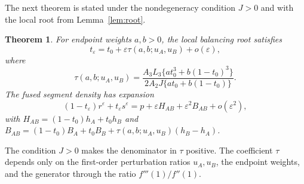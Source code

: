 \documentclass[11pt]{article}
\theoremstyle{plain}
\newtheorem{theorem}{Theorem}
\theoremstyle{definition}
\theoremstyle{definition}
\newcommand{\eps}{\varepsilon}
\begin{document}
The next theorem is stated under the nondegeneracy condition $J>0$ and with the local root from Lemma~\ref{lem:root}.

\begin{theorem}\label{thm:binary}
For endpoint weights $a,b>0$, the local balancing root satisfies
\[
t_\eps=t_0+\eps\tau(a,b;u_A,u_B)+o(\eps),
\]
where
\[
\tau(a,b;u_A,u_B)=
\frac{A_3L_3\{a t_0^3+b(1-t_0)^3\}}
{2A_2J\{a t_0+b(1-t_0)\}}.
\]
The fused segment density has expansion
\[
(1-t_\eps)r^\eps+t_\eps s^\eps
=p+\eps H_{AB}+\eps^2B_{AB}+o(\eps^2),
\]
with
$H_{AB}=(1-t_0)h_A+t_0h_B$
and
$B_{AB}=(1-t_0)B_A+t_0B_B+\tau(a,b;u_A,u_B)(h_B-h_A)$.
\end{theorem}

The condition $J>0$ makes the denominator in $\tau$ positive. The coefficient $\tau$ depends only on the first-order perturbation ratios $u_A,u_B$, the endpoint weights, and the generator through the ratio $f'''(1)/f''(1)$.
\end{document}
